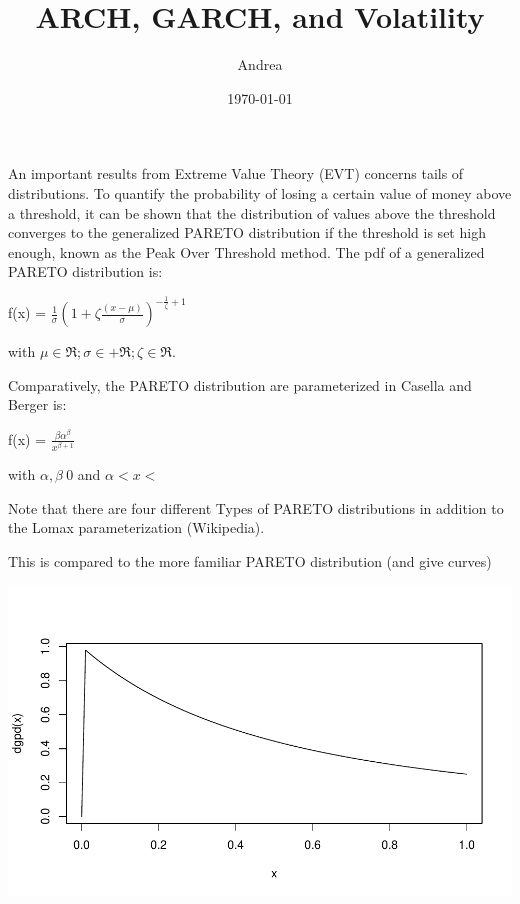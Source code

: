 \documentclass[11pt]{article}\usepackage[]{graphicx}\usepackage[]{color}
\title{ARCH, GARCH, and Volatility}
\author{Andrea}
\date{\today}
\makeatletter
\def\maxwidth{ %
  \ifdim\Gin@nat@width>\linewidth
    \linewidth
  \else
    \Gin@nat@width
  \fi
}
\newenvironment{kframe}{%
 \def\at@end@of@kframe{}%
 \ifinner\ifhmode%
  \def\at@end@of@kframe{\end{minipage}}%
  \begin{minipage}{\columnwidth}%
 \fi\fi%
 \def\FrameCommand##1{\hskip\@totalleftmargin \hskip-\fboxsep
 \colorbox{shadecolor}{##1}\hskip-\fboxsep
     \hskip-\linewidth \hskip-\@totalleftmargin \hskip\columnwidth}%
 \MakeFramed {\advance\hsize-\width
   \@totalleftmargin\z@ \linewidth\hsize
   \@setminipage}}%
 {\par\unskip\endMakeFramed%
 \at@end@of@kframe}
\newenvironment{knitrout}{}{} %
\makeatother
\begin{document}
\maketitle






An important results from Extreme Value Theory (EVT) concerns tails of distributions. To quantify the probability of losing a certain value of money above a threshold, it can be shown that the distribution of values above the threshold converges to the generalized PARETO distribution if the threshold is set high enough, known as the Peak Over Threshold method. The pdf of a generalized PARETO distribution is:

f(x) = $\frac{1}{\sigma}(1 + \zeta\frac{(x-\mu)}{\sigma})^{-\frac{1}{\zeta} + 1}$

with $\mu \in \Re; \sigma \in + \Re; \zeta \in \Re$.

Comparatively, the PARETO distribution are parameterized in Casella and Berger is:

f(x) = $\frac{\beta\alpha^{\beta}}{x^{\beta + 1}}$

with $\alpha, \beta \> 0$ and $\alpha < x <$ \infty

Note that there are four different Types of PARETO distributions in addition to the Lomax parameterization (Wikipedia).

This is compared to the more familiar PARETO distribution (and give curves)

\begin{knitrout}\footnotesize
{}\color{fgcolor}

{\centering \includegraphics[width=\maxwidth]{figure/pareto-1} 

}


\begin{kframe}

{\ttfamily\noindent\bfseries{}}\end{kframe}
\end{knitrout}
\end{document}
